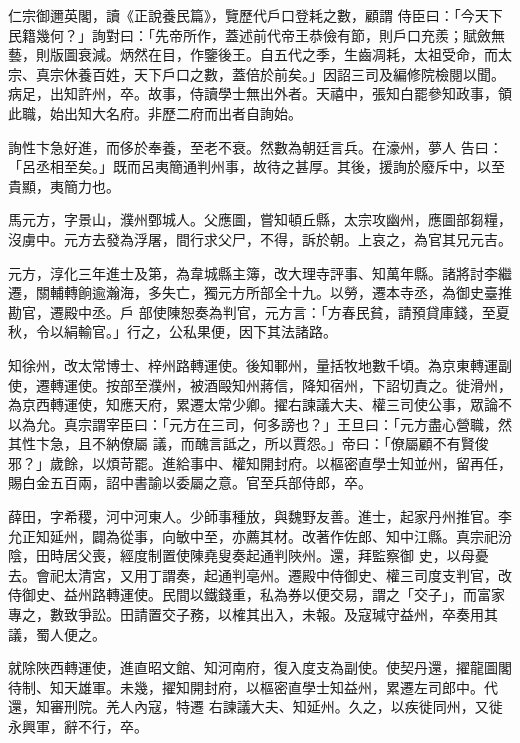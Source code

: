 \begin{pinyinscope}
 仁宗御邇英閣，讀《正說養民篇》，覽歷代戶口登耗之數，顧謂
 侍臣曰：「今天下民籍幾何？」詢對曰：「先帝所作，蓋述前代帝王恭儉有節，則戶口充羨；賦斂無藝，則版圖衰減。炳然在目，作鑒後王。自五代之季，生齒凋耗，太祖受命，而太宗、真宗休養百姓，天下戶口之數，蓋倍於前矣。」因詔三司及編修院檢閱以聞。病足，出知許州，卒。故事，侍讀學士無出外者。天禧中，張知白罷參知政事，領此職，始出知大名府。非歷二府而出者自詢始。



 詢性卞急好進，而侈於奉養，至老不衰。然數為朝廷言兵。在濠州，夢人
 告曰：「呂丞相至矣。」既而呂夷簡通判州事，故待之甚厚。其後，援詢於廢斥中，以至貴顯，夷簡力也。



 馬元方，字景山，濮州鄄城人。父應圖，嘗知頓丘縣，太宗攻幽州，應圖部芻糧，沒虜中。元方去發為浮屠，間行求父尸，不得，訴於朝。上哀之，為官其兄元吉。



 元方，淳化三年進士及第，為韋城縣主簿，改大理寺評事、知萬年縣。諸將討李繼遷，關輔轉餉逾瀚海，多失亡，獨元方所部全十九。以勞，遷本寺丞，為御史臺推勘官，遷殿中丞。戶
 部使陳恕奏為判官，元方言：「方春民貧，請預貸庫錢，至夏秋，令以絹輸官。」行之，公私果便，因下其法諸路。



 知徐州，改太常博士、梓州路轉運使。後知鄆州，量括牧地數千頃。為京東轉運副使，遷轉運使。按部至濮州，被酒毆知州蔣信，降知宿州，下詔切責之。徙滑州，為京西轉運使，知應天府，累遷太常少卿。擢右諫議大夫、權三司使公事，眾論不以為允。真宗謂宰臣曰：「元方在三司，何多謗也？」王旦曰：「元方盡心營職，然其性卞急，且不納僚屬
 議，而醜言詆之，所以賈怨。」帝曰：「僚屬顧不有賢俊邪？」歲餘，以煩苛罷。進給事中、權知開封府。以樞密直學士知並州，留再任，賜白金五百兩，詔中書諭以委屬之意。官至兵部侍郎，卒。



 薛田，字希稷，河中河東人。少師事種放，與魏野友善。進士，起家丹州推官。李允正知延州，闢為從事，向敏中至，亦薦其材。改著作佐郎、知中江縣。真宗祀汾陰，田時居父喪，經度制置使陳堯叟奏起通判陜州。還，拜監察御
 史，以母憂去。會祀太清宮，又用丁謂奏，起通判亳州。遷殿中侍御史、權三司度支判官，改侍御史、益州路轉運使。民間以鐵錢重，私為券以便交易，謂之「交子」，而富家專之，數致爭訟。田請置交子務，以榷其出入，未報。及寇瑊守益州，卒奏用其議，蜀人便之。



 就除陜西轉運使，進直昭文館、知河南府，復入度支為副使。使契丹還，擢龍圖閣待制、知天雄軍。未幾，擢知開封府，以樞密直學士知益州，累遷左司郎中。代還，知審刑院。羌人內寇，特遷
 右諫議大夫、知延州。久之，以疾徙同州，又徙永興軍，辭不行，卒。




\end{pinyinscope}
